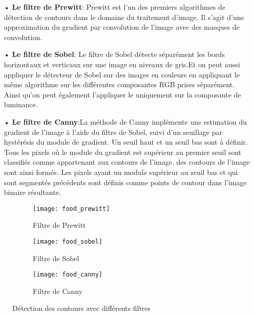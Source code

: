     \begin{itemize}
        \item[•]\textbf{Le filtre de Prewitt}: Prewitt est l'un des premiers algorithmes de détection de contours dans le domaine du traitement d'image.
        Il s'agit d'une approximation du gradient par convolution de l'image avec des masques de convolution.
        \item[•]\textbf{Le filtre de Sobel}: Le filtre de Sobel détecte séparément les bords horizontaux et verticaux sur une image en niveaux de gris.Et on peut aussi appliquer le détecteur de Sobel sur des images en couleurs en appliquant le même
        algorithme sur les différentes composantes RGB prises séparément. Ainsi qu’on peut également
        l’appliquer le uniquement sur la composante de luminance.
        \item[•]\textbf{Le filtre de Canny}:La méthode de Canny implémente une estimation du gradient de l'image à l'aide du filtre de Sobel, suivi
        d'un seuillage par hystérésis du module de gradient. Un seuil haut et un seuil bas sont à définir.
        Tous les pixels où le module du gradient est supérieur au premier seuil sont classifiés comme appartenant
        aux contours de l'image, des contours de l'image sont ainsi formés. Les pixels ayant un module supérieur
        au seuil bas et qui sont segmentés précédents sont définis comme points de contour dans l'image binaire
        résultante.\cite{akacemMaster}
    \end{itemize}
    \begin{figure}[H]
        \begin{subfigure}{0.3\textwidth}
            \centering
            \texttt{[image: food\_prewitt]}
            \caption{Filtre de Prewitt}
        \end{subfigure}
        \hfill
        \begin{subfigure}{0.3\textwidth}
            \centering
            \texttt{[image: food\_sobel]}
            \caption{Filtre de Sobel}
        \end{subfigure}
        \hfill
        \begin{subfigure}{0.3\textwidth}
            \centering
            \texttt{[image: food\_canny]}
            \caption{Filtre de Canny}
        \end{subfigure}
        \caption{Détection des contours avec différents filtres}
    \end{figure}

